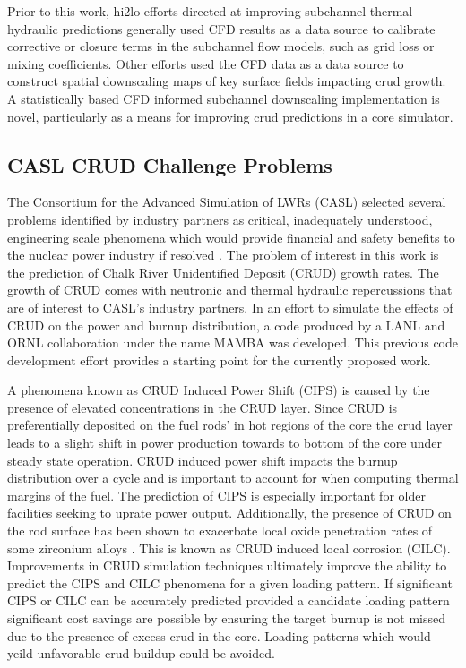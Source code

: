 Prior to this work, hi2lo efforts directed at improving subchannel thermal hydraulic predictions generally used CFD results as a data source to calibrate corrective or closure terms in the subchannel flow models, such as grid loss or mixing coefficients.  Other efforts used the CFD data as a data source to construct spatial downscaling maps of key surface fields impacting crud growth.  A statistically based CFD informed subchannel downscaling implementation is novel, particularly as a means for improving crud predictions in a core simulator.


\subsection{CASL CRUD Challenge Problems}

The Consortium for the Advanced Simulation of LWRs (CASL) selected several problems identified by industry partners as critical, inadequately understood, engineering scale phenomena which would provide
financial and safety benefits to the nuclear power industry if resolved \cite{Turinsky15}.
The problem of
interest in this work is the prediction of Chalk River Unidentified Deposit
(CRUD) growth rates.  The growth of CRUD comes with neutronic and thermal
hydraulic repercussions that are of interest to CASL's industry partners.
In an effort to simulate the
effects of CRUD on the power and burnup distribution, a code produced by a LANL
and ORNL collaboration \cite{collins16} under the name MAMBA was developed.
This previous code development effort provides a starting point for the currently proposed work.

A phenomena known as CRUD Induced Power Shift (CIPS) is caused by the presence
of elevated  concentrations in the CRUD layer.  Since CRUD is preferentially
deposited on the fuel rods' in hot regions of the core the crud layer leads to a slight shift in
power production towards to bottom of the core under steady state operation.  
CRUD induced power shift impacts the burnup distribution over a cycle
and is important to account for when computing thermal
margins of the fuel.  The prediction
of CIPS is especially important for older facilities seeking to uprate power
output.  Additionally, the presence of CRUD on the rod surface has been shown
to exacerbate local oxide penetration rates of some zirconium alloys \cite{adamson07}.
This is known as CRUD induced local corrosion (CILC).  Improvements in CRUD
simulation techniques ultimately improve the ability to predict the CIPS and
CILC phenomena for a given loading pattern.  If significant CIPS or CILC can be accurately predicted provided a candidate loading pattern significant cost savings are possible by ensuring the target burnup is not missed due to the presence of excess crud in the core.  Loading patterns which would yeild unfavorable crud buildup could be avoided.

